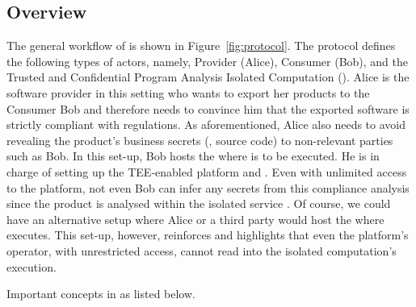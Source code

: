 \subsection{Overview}
\label{subsec:overview}

The general workflow of \tcpa is shown in Figure~\ref{fig:protocol}. The protocol defines the following types of actors, namely, Provider (Alice), Consumer (Bob), and the Trusted and Confidential Program Analysis Isolated Computation (\TCPAIC{}). Alice is the software provider in this 
setting who wants to export her products to the Consumer Bob and therefore needs to convince 
him that the exported software is strictly compliant with regulations. 
As aforementioned, Alice also needs to avoid revealing the product's business secrets 
(\eg, source code) to non-relevant parties such as Bob. In this set-up, Bob hosts the \tee{} where \TCPAIC{} is to be executed. He is in charge of setting up the TEE-enabled platform and \TCPAIC{}. Even with unlimited access to the platform, not even Bob can infer any secrets from this compliance analysis since the product is analysed within the isolated service \TCPAIC{}. Of course, we could have an alternative setup where Alice or a third party would host the \tee where \TCPAIC{} executes. This set-up, however, reinforces and highlights that even the platform's operator, with unrestricted access, cannot read into the isolated computation's execution.

Important concepts in \tcpa as listed below.

